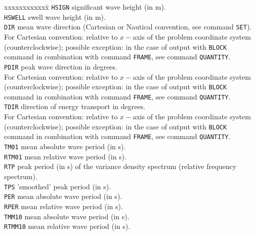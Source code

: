 \documentclass[12pt]{book}
\begin{document}
\begin{tabbing}
 xxxxxxxxxxxx\= \kill
{\tt HSIGN}  \> significant wave height (in m).\\
{\tt HSWELL} \> swell wave height (in m).\\
{\tt DIR}    \> mean wave direction (Cartesian or Nautical convention, see command {\tt SET}).\+\\
                For Cartesian convention: relative to $x-$axis of the problem coordinate system\\
                (counterclockwise); possible exception: in the case of output with {\tt BLOCK}\\
                command in combination with command {\tt FRAME}, see command {\tt QUANTITY}.\-\\
{\tt PDIR}   \> peak wave direction in degrees.\+\\
                For Cartesian convention: relative to $x-$axis of the problem coordinate system\\
                (counterclockwise); possible exception: in the case of output with {\tt BLOCK}\\
                command in combination with command {\tt FRAME}, see command {\tt QUANTITY}.\-\\
{\tt TDIR}   \> direction of energy transport in degrees.\+\\
                For Cartesian convention: relative to $x-$axis of the problem coordinate system\\
                (counterclockwise); possible exception: in the case of output with {\tt BLOCK}\\
                command in combination with command {\tt FRAME}, see command {\tt QUANTITY}.\-\\
{\tt TM01}   \> mean absolute wave period (in s).\\
{\tt RTM01}  \> mean relative wave period (in s).\\
{\tt RTP}    \> peak period (in s) of the variance density spectrum (relative frequency spectrum).\\
{\tt TPS}    \> 'smoothed' peak period (in s).\\
{\tt PER}    \> mean absolute wave period (in s).\\
{\tt RPER}   \> mean relative wave period (in s).\\
{\tt TMM10}  \> mean absolute wave period (in s).\\
{\tt RTMM10} \> mean relative wave period (in s).\\

\end{tabbing}
\end{document}
